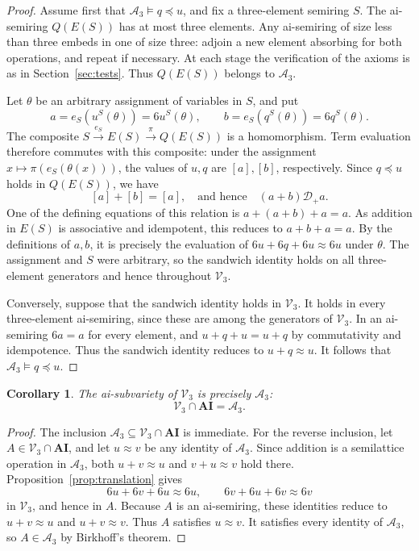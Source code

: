 \documentclass[11pt,reqno]{amsart}
\numberwithin{equation}{section}
\newtheorem{corollary}[theorem]{Corollary}
\theoremstyle{definition}
\theoremstyle{remark}
\newcommand{\AI}{\mathbf{AI}}
\newcommand{\Vthree}{\mathcal V_3}
\newcommand{\Athree}{\mathcal A_3}
\newcommand{\eqid}{\approx}
\begin{document}
\begin{proof}
Assume first that $\Athree\models q\preceq u$, and fix
a three-element semiring $S$. The ai-semiring
$Q(E(S))$ has at most three elements.
Any ai-semiring of size less than three embeds in one
of size three: adjoin a new element absorbing for both
operations, and repeat if necessary. At each stage
the verification of the axioms is as in
Section~\ref{sec:tests}. Thus $Q(E(S))$ belongs to
$\Athree$.

Let $\theta$ be an arbitrary assignment of variables
in $S$, and put
\[
a=e_S(u^S(\theta))=6u^S(\theta),\qquad
b=e_S(q^S(\theta))=6q^S(\theta).
\]
The composite
$S\xrightarrow{e_S}E(S)\xrightarrow{\pi}Q(E(S))$
is a homomorphism. Term evaluation therefore commutes
with this composite: under the assignment
$x\mapsto\pi(e_S(\theta(x)))$, the values of $u,q$
are $[a],[b]$, respectively. Since $q\preceq u$
holds in $Q(E(S))$, we have
\[
[a]+[b]=[a],
\quad\text{and hence}\quad
(a+b)\mathrel{\mathcal D_+}a.
\]
One of the defining equations of this relation is
$a+(a+b)+a=a$. As addition in $E(S)$ is associative
and idempotent, this reduces to $a+b+a=a$.
By the definitions of $a,b$, it is precisely the
evaluation of $6u+6q+6u\eqid6u$ under $\theta$.
The assignment and $S$ were arbitrary, so the
sandwich identity holds on all three-element
generators and hence throughout $\Vthree$.

Conversely, suppose that the sandwich identity holds
in $\Vthree$. It holds in every three-element
ai-semiring, since these are among the generators
of $\Vthree$. In an ai-semiring $6a=a$ for every
element, and
$u+q+u=u+q$ by commutativity and idempotence.
Thus the sandwich identity reduces to $u+q\eqid u$.
It follows that $\Athree\models q\preceq u$.
\end{proof}

\begin{corollary}\label{cor:intersection}
The ai-subvariety of $\Vthree$ is precisely $\Athree$:
\[
\Vthree\cap\AI=\Athree.
\]
\end{corollary}

\begin{proof}
The inclusion $\Athree\subseteq\Vthree\cap\AI$ is immediate.
For the reverse inclusion, let $A\in\Vthree\cap\AI$, and let
$u\eqid v$ be any identity of $\Athree$. Since addition is a
semilattice operation in $\Athree$, both
$u+v\eqid u$ and $v+u\eqid v$ hold there.
Proposition~\ref{prop:translation} gives
\[
6u+6v+6u\eqid6u,\qquad
6v+6u+6v\eqid6v
\]
in $\Vthree$, and hence in $A$. Because $A$ is an ai-semiring,
these identities reduce to $u+v\eqid u$ and $u+v\eqid v$.
Thus $A$ satisfies $u\eqid v$. It satisfies every identity of
$\Athree$, so $A\in\Athree$ by Birkhoff's theorem.
\end{proof}
\end{document}
